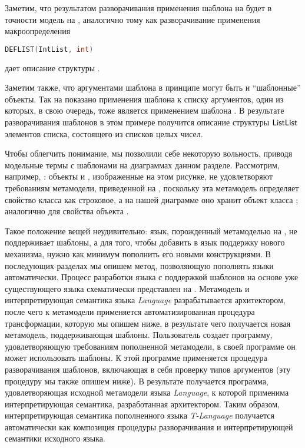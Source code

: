 Заметим, что результатом разворачивания применения шаблона на  будет в точности модель на , аналогично тому как разворачивание применения макроопределения
\begin{lstlisting}[language=C]
DEFLIST(IntList, int)
\end{lstlisting}
дает описание структуры .

Заметим также, что аргументами шаблона в принципе могут быть и ``шаблонные'' объекты. 
%
%
Так на  показано применения шаблона  к списку аргументов, один из которых, в свою очередь, тоже является применением шаблона . В результате разворачивания шаблонов в этом примере получится описание структуры $\mathsf{ListList}$ элементов списка, состоящего из списков целых чисел.

Чтобы облегчить понимание, мы позволили себе некоторую вольность, приводя модельные термы с шаблонами на диаграммах данном разделе. Рассмотрим, например, : объекты  и , изображенные на этом рисунке, не удовлетворяют требованиям метамодели, приведенной на , поскольку эта метамодель определяет свойство  класса  как строковое, а на нашей диаграмме оно хранит объект класса ; аналогично для свойства  объекта . 

Такое положение вещей неудивительно: язык, порожденный метамоделью на , не поддерживает шаблоны, а для того, чтобы добавить в язык поддержку нового механизма, нужно как минимум пополнить его новыми конструкциями. В последующих разделах мы опишем метод, позволяющую пополнять языки автоматически. Процесс разработки языка с поддержкой шаблонов на основе уже существующего языка схематически представлен на .
%
%
Метамодель и интерпретирующая семантика языка \emph{Language} разрабатывается архитектором, после чего к метамодели применяется автоматизированная процедура трансформации, которую мы опишем ниже, в результате чего получается новая метамодель, поддерживающая шаблоны. Пользователь создает программу, удовлетворяющую требованиям пополненной метамодели, в своей программе он может использовать шаблоны. К этой программе применяется процедура разворачивания шаблонов, включающая в себя проверку типов аргументов (эту процедуру мы также опишем ниже). В результате получается программа, удовлетворяющая исходной метамодели языка \emph{Language}, к которой применима интерпретирующая семантика, разработанная архитектором. Таким образом, интерпретирующая семантика пополненного языка \emph{T-Language} получается автоматически как композиция процедуры разворачивания и интерпретирующей семантики исходного языка.

